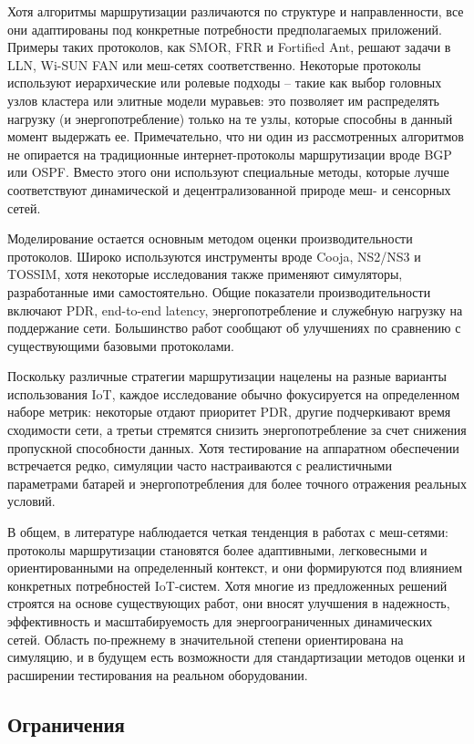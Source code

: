 \documentclass[%
]{report}
\begin{document}
Хотя алгоритмы маршрутизации различаются по
структуре и направленности, все они адаптированы
под конкретные потребности предполагаемых приложений.
Примеры таких протоколов, как SMOR, FRR и Fortified Ant,
решают задачи в LLN, Wi-SUN FAN или меш-сетях
соответственно. Некоторые протоколы используют
иерархические или ролевые подходы --
такие как выбор головных узлов кластера или
элитные модели муравьев: это позволяет им
распределять нагрузку (и энергопотребление)
только на те узлы, которые способны в данный момент
выдержать ее.
Примечательно, что ни один из рассмотренных алгоритмов
не опирается на традиционные интернет-протоколы маршрутизации
вроде BGP или OSPF. Вместо этого они
используют специальные методы, которые лучше соответствуют
динамической и децентрализованной природе меш- и сенсорных сетей.

Моделирование остается основным методом оценки
производительности протоколов. Широко используются инструменты вроде Cooja, NS2/NS3 и TOSSIM,
хотя некоторые исследования также применяют
симуляторы, разработанные ими самостоятельно. Общие показатели
производительности включают PDR, end-to-end latency,
энергопотребление и служебную нагрузку на поддержание сети.
Большинство работ сообщают об улучшениях по сравнению
с существующими базовыми протоколами.

Поскольку различные стратегии маршрутизации
нацелены на разные варианты использования IoT,
каждое исследование обычно фокусируется
на определенном наборе метрик: некоторые
отдают приоритет PDR, другие подчеркивают
время сходимости сети, а третьи
стремятся снизить энергопотребление за
счет снижения пропускной способности данных.
Хотя тестирование на аппаратном
обеспечении встречается редко, симуляции
часто настраиваются с реалистичными параметрами
батарей и энергопотребления для более точного
отражения реальных условий.

В общем, в литературе наблюдается четкая
тенденция в работах с  меш-сетями:
протоколы маршрутизации становятся более адаптивными,
легковесными и ориентированными на определенный контекст,
и они формируются под влиянием конкретных
потребностей IoT-систем. Хотя многие
из предложенных решений строятся на
основе существующих работ,
они вносят улучшения в надежность,
эффективность и масштабируемость для энергоограниченных
динамических сетей. Область по-прежнему в
значительной степени ориентирована на симуляцию,
и в будущем есть возможности
для стандартизации методов оценки и расширении
тестирования на реальном оборудовании.

\subsection{Ограничения}\label{limitations}
\end{document}
